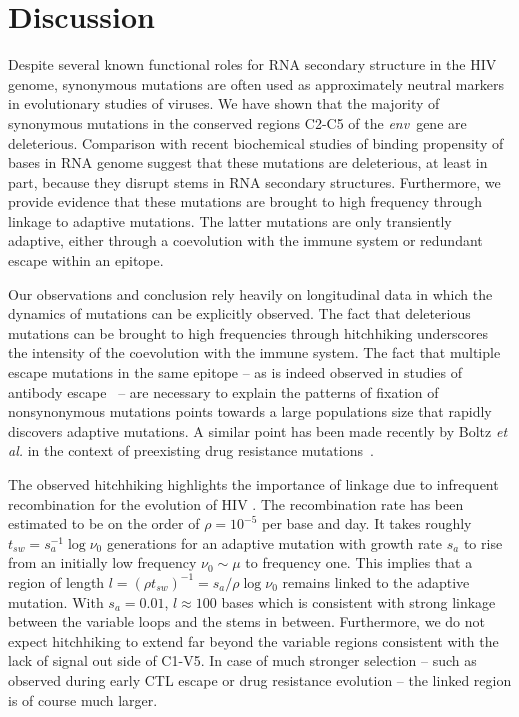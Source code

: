 \documentclass[rmp, twocolumn]{revtex4}
\newcommand{\env}{\textit{env}}
\begin{document}
\section{Discussion}
Despite several known functional roles for RNA secondary structure in the HIV
genome, synonymous mutations are often used as approximately neutral markers in
evolutionary studies of viruses. We have shown that the majority of synonymous
mutations in the conserved regions C2-C5 of the \env~gene are deleterious.
Comparison with recent biochemical studies of binding propensity of bases in RNA
genome suggest that these mutations are deleterious, at least in part, because they disrupt
stems in RNA secondary structures. Furthermore, we provide evidence that these
mutations are brought to high frequency through linkage to adaptive mutations.
The latter mutations are only transiently adaptive, either through a
coevolution with the immune system or redundant escape within an epitope. 

Our observations and conclusion rely heavily on longitudinal data in which the
dynamics of mutations can be explicitly observed. The fact that deleterious
mutations can be brought to high frequencies through hitchhiking underscores
the intensity of the coevolution with the immune system. The fact that
multiple escape mutations in the same epitope -- as is indeed observed in
studies of antibody escape~\citep{moore_limited_2009, bar_early_2012} -- are
necessary to explain the patterns of fixation of nonsynonymous mutations points
towards a large populations size that rapidly discovers adaptive mutations. A
similar point has been made recently by Boltz {\it et al.} in the context of
preexisting drug resistance mutations~\citep{boltz_ultrasensitive_2012}. 

The observed hitchhiking highlights the importance of linkage due to infrequent
recombination for the evolution of HIV
\citep{neher_recombination_2010,batorsky_estimate_2011,
josefsson_majority_2011}. The recombination rate has been estimated to be on the
order of $\rho = 10^{-5}$ per base and day. It takes roughly $t_{sw} = s_a^{-1}
\log \nu_0$ generations for an adaptive mutation with growth rate $s_a$ to rise
from an initially low frequency $\nu_0\sim \mu$ to frequency one. This implies
that a region of length $l = (\rho t_{sw})^{-1} = s_a / \rho \log \nu_0$ remains
linked to the adaptive mutation. With $s_a=0.01$, $l\approx 100$ bases which is
consistent with strong linkage between the variable loops and the stems in
between. Furthermore, we do not expect hitchhiking to extend far beyond
the variable regions consistent with the lack of signal out side of C1-V5. In
case of much stronger selection -- such as observed during early CTL escape or
drug resistance evolution -- the linked  region is of course much larger. 
\end{document}
